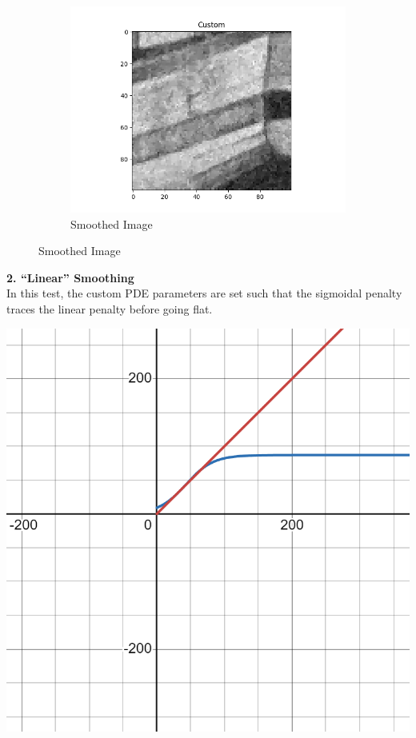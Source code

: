 \documentclass{article}
\begin{document}
\begin{center}
\begin{figure}[!htb]
\begin{center}
        \hfill
        \begin{subfigure}[b]{0.5\textwidth}
          \includegraphics[width=\textwidth]{../generated_images/Custom_test1.png}
          \caption{Smoothed Image}
        \end{subfigure}
      \end{center}
    \end{figure}
  \end{center}

  \newpage
  \noindent
  \textbf{2. ``Linear'' Smoothing}\\
  In this test, the custom PDE parameters are set such that the sigmoidal penalty
  traces the linear penalty before going flat.\\
  \begin{center}
    \includegraphics[scale=0.2]{../report_images/linear_smoothing.png}\\
  \end{center}
  \vspace{12pt}
\end{document}
